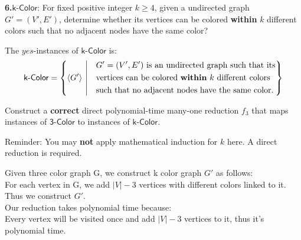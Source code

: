 \begin{parts}
    \textbf{6.}$\mathsf{k \text{-} Color}$: For fixed positive integer $k \geq 4$, given a undirected graph $G' = (V', E')$, determine whether its vertices can be colored \textbf{within} $k$ different colors such that no adjacent nodes have the same color?

    The $yes$-instances of $\mathsf{k \text{-} Color}$ is:
    \begin{equation*}
        \mathsf{k \text{-} Color} = \left\{\langle{G'\rangle}~\middle|~~~
        \begin{aligned}
             & \text{$G' = (V', E')$ is an undirected graph such that its} \\&\text{vertices can be colored \textbf{within} $k$ different colors} \\&\text{such that no adjacent nodes have the same color.}
        \end{aligned}\right\}
    \end{equation*}

    Construct a \textbf{correct} {\color{blue} direct} {\color{red} polynomial-time many-one reduction} $f_3$ that maps instances of $\mathsf{3 \text{-} Color}$ to instances of $\mathsf{k \text{-} Color}$.

    Reminder: You may \textbf{not} apply mathematical induction for $k$ here. A {\color{blue} direct} reduction is required.

    \begin{solution}
        Given three color graph G, we construct k color graph $G'$ as follows: \\
        For each vertex in G, we add $|V| - 3$ vertices with different colors linked to it.
        Thus we construct $G'$. \\
        Our reduction takes polynomial time because: \\
        Every vertex will be visited once and add $|V| - 3$ vertices to it, thus it's polynomial time.
    \end{solution}

\end{parts}
